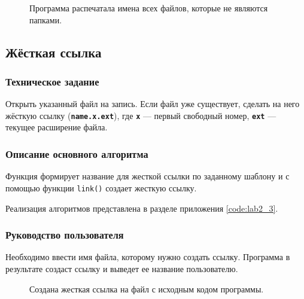 \documentclass[a4paper,14pt]{extarticle}
\begin{document}
\begin{figure}[h]
\caption{Программа распечатала имена всех файлов, которые не являются папками.}
\label{1.png}
\end{figure}

\subsection{Жёсткая ссылка}
\subsubsection{Техническое задание}
Открыть указанный файл на запись. Если файл уже существует, сделать на него жёсткую ссылку (\textbf{\texttt{name.x.ext}}), где \textbf{\texttt{x}} --- первый свободный номер, \textbf{\texttt{ext}} --- текущее расширение файла.

\subsubsection{Описание основного алгоритма}
Функция формирует название для жесткой ссылки по заданному шаблону и с помощью функции \verb|link()| создает жесткую ссылку.

Реализация алгоритмов представлена в разделе приложения \ref{code:lab2_3}.

\subsubsection{Руководство пользователя}
Необходимо ввести имя файла, которому нужно создать ссылку. Программа в результате создаст ссылку и выведет ее название пользователю.

\begin{figure}[h]
\caption{Создана жесткая ссылка на файл с исходным кодом программы.}
\label{1.png}
\end{figure}
\end{document}
